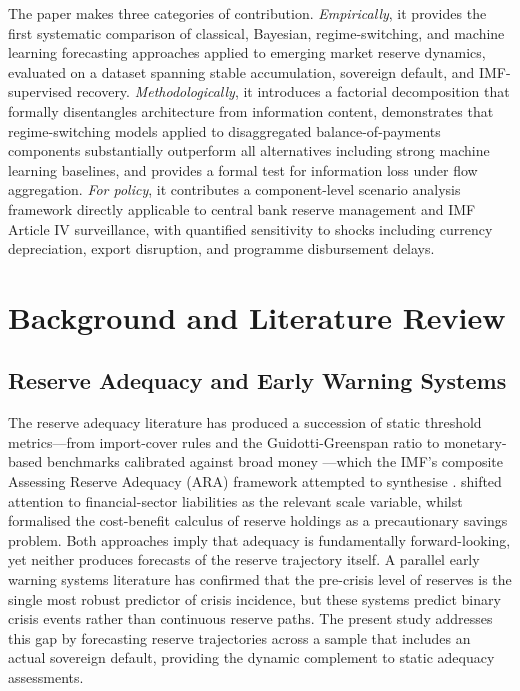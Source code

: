 \documentclass[12pt,a4paper]{article}
\begin{document}
The paper makes three categories of contribution. \textit{Empirically}, it provides the first systematic comparison of classical, Bayesian, regime-switching, and machine learning forecasting approaches applied to emerging market reserve dynamics, evaluated on a dataset spanning stable accumulation, sovereign default, and IMF-supervised recovery. \textit{Methodologically}, it introduces a factorial decomposition that formally disentangles architecture from information content, demonstrates that regime-switching models applied to disaggregated balance-of-payments components substantially outperform all alternatives including strong machine learning baselines, and provides a formal test for information loss under flow aggregation. \textit{For policy}, it contributes a component-level scenario analysis framework directly applicable to central bank reserve management and IMF Article IV surveillance, with quantified sensitivity to shocks including currency depreciation, export disruption, and programme disbursement delays.

\section{Background and Literature Review}

\subsection{Reserve Adequacy and Early Warning Systems}

The reserve adequacy literature has produced a succession of static threshold metrics---from import-cover rules and the Guidotti-Greenspan ratio \citep{Greenspan1999} to monetary-based benchmarks calibrated against broad money \citep{Calvo1996,Wijnholds2001}---which the IMF's composite Assessing Reserve Adequacy (ARA) framework attempted to synthesise \citep{IMF2011,IMF2015}. \cite{Obstfeld2010} shifted attention to financial-sector liabilities as the relevant scale variable, whilst \cite{JeanneRanciere2011} formalised the cost-benefit calculus of reserve holdings as a precautionary savings problem. Both approaches imply that adequacy is fundamentally forward-looking, yet neither produces forecasts of the reserve trajectory itself. A parallel early warning systems literature \citep{KaminskyLizondoReinhart1998,FrankelSaravelos2012} has confirmed that the pre-crisis level of reserves is the single most robust predictor of crisis incidence, but these systems predict binary crisis events rather than continuous reserve paths. The present study addresses this gap by forecasting reserve trajectories across a sample that includes an actual sovereign default, providing the dynamic complement to static adequacy assessments.
\end{document}
